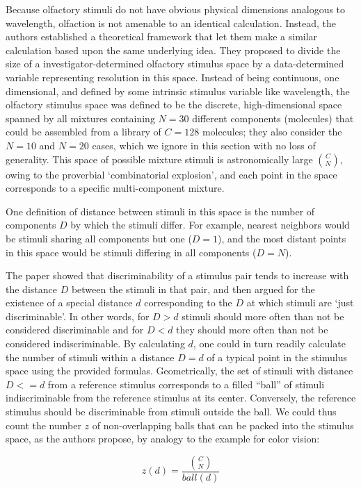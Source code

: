 \documentclass[letterpaper,twocolumn,10pt]{article}
\begin{document}
Because olfactory stimuli do not have obvious physical dimensions analogous to wavelength, 
olfaction is not amenable to an identical calculation.  
Instead, the authors established a theoretical framework that let them make a similar calculation based upon the same underlying idea.  
They proposed to divide the size of a investigator-determined olfactory stimulus space by a data-determined variable representing resolution in this space. 
Instead of being continuous, one dimensional, and defined by some intrinsic stimulus variable like wavelength, 
the olfactory stimulus space was defined to be the discrete, high-dimensional space spanned by all mixtures containing $N=30$ different components (molecules) that could be assembled from a library of $C=128$ molecules; 
they also consider the $N=10$ and $N=20$ cases, which we ignore in this section with no loss of generality. 
This space of possible mixture stimuli is astronomically large ${C \choose N}$, 
owing to the proverbial `combinatorial explosion', 
and each point in the space corresponds to a specific multi-component mixture. 

One definition of distance between stimuli in this space is the number of components $D$ by which the stimuli differ. 
For example, nearest neighbors would be stimuli sharing all components but one ($D=1$), 
and the most distant points in this space would be stimuli differing in all components ($D=N$). 

The paper showed that discriminability of a stimulus pair tends to increase with the distance $D$ between the stimuli in that pair, 
and then argued for the existence of a special distance $d$ corresponding to the $D$ at which stimuli are `just discriminable'.  
In other words, for $D>d$ stimuli should more often than not be considered discriminable 
and for $D<d$ they should more often than not be considered indiscriminable.  
By calculating $d$, one could in turn readily calculate the number of stimuli within a distance $D=d$ of a typical point in the stimulus space using the provided formulas. 
Geometrically, the set of stimuli with distance $D<=d$ from a reference stimulus corresponds to a filled “ball” of stimuli indiscriminable from the reference stimulus at its center.  
Conversely, the reference stimulus should be discriminable from stimuli outside the ball.  
We could thus count the number $z$ of non-overlapping balls that can be packed into the stimulus space, 
as the authors propose, by analogy to the example for color vision: 

\begin{equation}
\label{eq:disc}
z(d) = \frac{\binom{C}{N}}{ball(d)}  
\end{equation}
\end{document}
